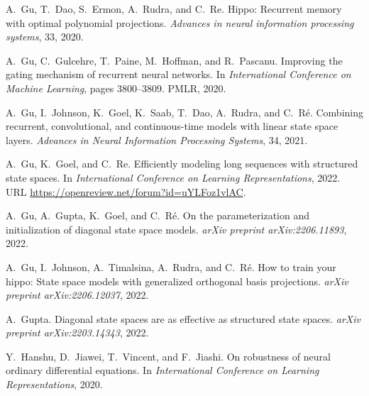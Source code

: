 \documentclass{MITcsail}
\begin{document}
\begin{thebibliography}{96}
A.~Gu, T.~Dao, S.~Ermon, A.~Rudra, and C.~Re.
\newblock Hippo: Recurrent memory with optimal polynomial projections.
\newblock \emph{Advances in neural information processing systems}, 33,
  2020{}.

A.~Gu, C.~Gulcehre, T.~Paine, M.~Hoffman, and R.~Pascanu.
\newblock Improving the gating mechanism of recurrent neural networks.
\newblock In \emph{International Conference on Machine Learning}, pages
  3800--3809. PMLR, 2020{}.

A.~Gu, I.~Johnson, K.~Goel, K.~Saab, T.~Dao, A.~Rudra, and C.~R{\'e}.
\newblock Combining recurrent, convolutional, and continuous-time models with
  linear state space layers.
\newblock \emph{Advances in Neural Information Processing Systems}, 34, 2021.

A.~Gu, K.~Goel, and C.~Re.
\newblock Efficiently modeling long sequences with structured state spaces.
\newblock In \emph{International Conference on Learning Representations},
  2022{}.
\newblock URL \url{https://openreview.net/forum?id=uYLFoz1vlAC}.

A.~Gu, A.~Gupta, K.~Goel, and C.~R{\'e}.
\newblock On the parameterization and initialization of diagonal state space
  models.
\newblock \emph{arXiv preprint arXiv:2206.11893}, 2022{}.

A.~Gu, I.~Johnson, A.~Timalsina, A.~Rudra, and C.~R{\'e}.
\newblock How to train your hippo: State space models with generalized
  orthogonal basis projections.
\newblock \emph{arXiv preprint arXiv:2206.12037}, 2022{}.

A.~Gupta.
\newblock Diagonal state spaces are as effective as structured state spaces.
\newblock \emph{arXiv preprint arXiv:2203.14343}, 2022.

Y.~Hanshu, D.~Jiawei, T.~Vincent, and F.~Jiashi.
\newblock On robustness of neural ordinary differential equations.
\newblock In \emph{International Conference on Learning Representations}, 2020.


\end{thebibliography}
\end{document}

